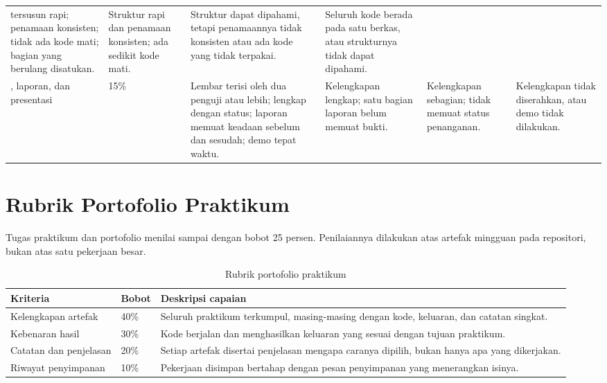 \begin{landscape}
\begin{table}[htbp]
{\begin{tabularx}{\linewidth}{@{}L{2.8cm} C{1.3cm} Y Y Y Y@{}}
 tersusun rapi; penamaan konsisten; tidak ada kode mati;
bagian yang berulang disatukan. &
Struktur rapi dan penamaan konsisten; ada sedikit kode mati. &
Struktur dapat dipahami, tetapi penamaannya tidak konsisten atau ada kode yang
tidak terpakai. &
Seluruh kode berada pada satu berkas, atau strukturnya tidak dapat dipahami. \\
\addlinespace
{}, laporan, dan presentasi & 15\% &
Lembar  terisi oleh dua penguji atau lebih; 
lengkap dengan status; laporan memuat keadaan sebelum dan sesudah; demo tepat
waktu. &
Kelengkapan lengkap; satu bagian laporan belum memuat bukti. &
Kelengkapan sebagian;  tidak memuat status penanganan. &
Kelengkapan tidak diserahkan, atau demo tidak dilakukan. \\
\bottomrule
\end{tabularx}}
\end{table}
\end{landscape}

\section{Rubrik Portofolio Praktikum}

Tugas praktikum dan portofolio menilai  sampai  dengan bobot
25 persen. Penilaiannya dilakukan atas artefak mingguan pada repositori,
bukan atas satu pekerjaan besar.

\begin{table}[htbp]
\centering
\caption{Rubrik portofolio praktikum}
\label{tab:rubrik-portofolio}
{\setlength{\tabcolsep}{4pt}\footnotesize%
\begin{tabularx}{\textwidth}{@{}L{3.4cm} C{1.4cm} Y@{}}
\toprule
\headrow \textbf{Kriteria} & \textbf{Bobot} & \textbf{Deskripsi capaian} \\
\midrule
Kelengkapan artefak & 40\% & Seluruh praktikum terkumpul, masing-masing dengan
kode, keluaran, dan catatan singkat. \\
\addlinespace
Kebenaran hasil & 30\% & Kode berjalan dan menghasilkan keluaran yang sesuai
dengan tujuan praktikum. \\
\addlinespace
Catatan dan penjelasan & 20\% & Setiap artefak disertai penjelasan mengapa
caranya dipilih, bukan hanya apa yang dikerjakan. \\
\addlinespace
Riwayat penyimpanan & 10\% & Pekerjaan disimpan bertahap dengan pesan
penyimpanan yang menerangkan isinya. \\
\bottomrule
\end{tabularx}}
\end{table}

